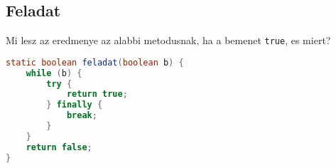 \documentclass{article}
\let\l\lstinline
\begin{document}
\subsection{Feladat}

Mi lesz az eredmenye az alabbi metodusnak, ha a bemenet \l{true}, es miert?

\begin{lstlisting}[language=Java, caption=Feladat]
static boolean feladat(boolean b) {
    while (b) {
        try {
            return true;
        } finally {
            break;
        }
    }
    return false;
}

\end{lstlisting}
\end{document}

